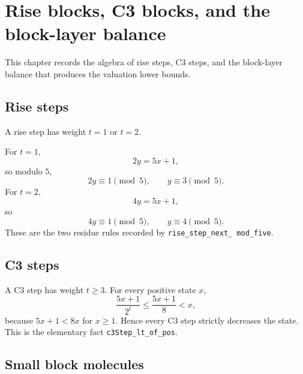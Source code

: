\section{Rise blocks, C3 blocks, and the block-layer balance}

This chapter records the algebra of rise steps, C3 steps, and the
block-layer balance that produces the valuation lower bounds.

\subsection{Rise steps}

A rise step has weight $t=1$ or $t=2$.

For $t=1$,
\begin{equation*}
  2y=5x+1,
\end{equation*}
so modulo $5$,
\begin{equation*}
  2y\equiv1\pmod5,
  \qquad
  y\equiv3\pmod5.
\end{equation*}
For $t=2$,
\begin{equation*}
  4y=5x+1,
\end{equation*}
so
\begin{equation*}
  4y\equiv1\pmod5,
  \qquad
  y\equiv4\pmod5.
\end{equation*}
These are the two residue rules recorded by
\texttt{rise\_\allowbreak step\_\allowbreak next\_\allowbreak
mod\_\allowbreak five}.

\subsection{C3 steps}

A C3 step has weight $t\ge3$.  For every positive state $x$,
\begin{equation*}
  \frac{5x+1}{2^t}\le\frac{5x+1}{8}<x,
\end{equation*}
because $5x+1<8x$ for $x\ge1$.  Hence every C3 step strictly
decreases the state.  This is the elementary fact
\texttt{c3Step\_\allowbreak lt\_\allowbreak of\_\allowbreak pos}.

\subsection{Small block molecules}


